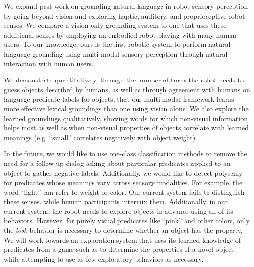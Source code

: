 We expand past work on grounding natural language in robot sensory perception by going beyond vision and exploring haptic, auditory, and proprioceptive robot senses.
We compare a vision only grounding system to one that uses these additional senses by employing an embodied robot playing \ispy with many human users.
To our knowledge, ours is the first robotic system to perform natural language grounding using multi-modal sensory perception through natural interaction with human users.

We demonstrate quantitatively, through the number of turns the robot needs to guess objects described by humans, as well as through agreement with humans on language predicate labels for objects, that our multi-modal framework learns more effective lexical groundings than one using vision alone.
We also explore the learned groundings qualitatively, showing words for which non-visual information helps most as well as when non-visual properties of objects correlate with learned meanings (e.g. ``small'' correlates negatively with object weight).

In the future, we would like to use one-class classification methods to remove the need for a follow-up dialog asking about particular predicates applied to an object to gather negative labels.
Additionally, we would like to detect polysemy for predicates whose meanings vary across sensory modalities.
For example, the word ``light'' can refer to weight or color.
Our current system fails to distinguish these senses, while human participants intermix them.
Additionally, in our current system, the robot needs to explore objects in advance using all of its behaviors.
However, for purely visual predicates like ``pink'' and other colors, only the {\it look} behavior is necessary to determine whether an object has the property.
We will work towards an exploration system that uses its learned knowledge of predicates from a game such as \ispy to determine the properties of a novel object while attempting to use as few exploratory behaviors as necessary.
